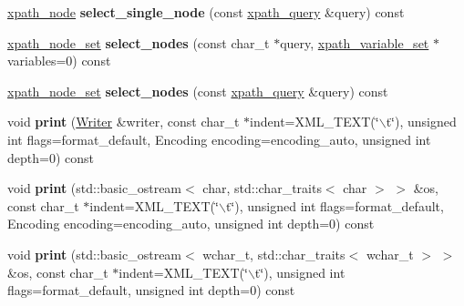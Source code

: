 \begin{DoxyCompactItemize}
\item 
\hypertarget{classphys_1_1xml_1_1Node_a6e63ac46658ba2484bf58d47f4fb4044}{
\hyperlink{classphys_1_1xml_1_1xpath__node}{xpath\_\-node} {\bfseries select\_\-single\_\-node} (const \hyperlink{classphys_1_1xml_1_1xpath__query}{xpath\_\-query} \&query) const }
\label{d7/d0a/classphys_1_1xml_1_1Node_a6e63ac46658ba2484bf58d47f4fb4044}

\item 
\hypertarget{classphys_1_1xml_1_1Node_ad59ea495afeb7bdfba213d0d77699bdc}{
\hyperlink{classphys_1_1xml_1_1xpath__node__set}{xpath\_\-node\_\-set} {\bfseries select\_\-nodes} (const char\_\-t $\ast$query, \hyperlink{classphys_1_1xml_1_1xpath__variable__set}{xpath\_\-variable\_\-set} $\ast$variables=0) const }
\label{d7/d0a/classphys_1_1xml_1_1Node_ad59ea495afeb7bdfba213d0d77699bdc}

\item 
\hypertarget{classphys_1_1xml_1_1Node_a283417484d52b3e4646affac0f84b068}{
\hyperlink{classphys_1_1xml_1_1xpath__node__set}{xpath\_\-node\_\-set} {\bfseries select\_\-nodes} (const \hyperlink{classphys_1_1xml_1_1xpath__query}{xpath\_\-query} \&query) const }
\label{d7/d0a/classphys_1_1xml_1_1Node_a283417484d52b3e4646affac0f84b068}

\item 
\hypertarget{classphys_1_1xml_1_1Node_a0b6778b4a7602abd979157adfbbe4d98}{
void {\bfseries print} (\hyperlink{classphys_1_1xml_1_1Writer}{Writer} \&writer, const char\_\-t $\ast$indent=XML\_\-TEXT(\char`\"{}$\backslash$t\char`\"{}), unsigned int flags=format\_\-default, Encoding encoding=encoding\_\-auto, unsigned int depth=0) const }
\label{d7/d0a/classphys_1_1xml_1_1Node_a0b6778b4a7602abd979157adfbbe4d98}

\item 
\hypertarget{classphys_1_1xml_1_1Node_a43cd84b829b4dd2acf0702960d485a11}{
void {\bfseries print} (std::basic\_\-ostream$<$ char, std::char\_\-traits$<$ char $>$ $>$ \&os, const char\_\-t $\ast$indent=XML\_\-TEXT(\char`\"{}$\backslash$t\char`\"{}), unsigned int flags=format\_\-default, Encoding encoding=encoding\_\-auto, unsigned int depth=0) const }
\label{d7/d0a/classphys_1_1xml_1_1Node_a43cd84b829b4dd2acf0702960d485a11}

\item 
\hypertarget{classphys_1_1xml_1_1Node_af879d58cf08553c5f2dfa813e7a56ce6}{
void {\bfseries print} (std::basic\_\-ostream$<$ wchar\_\-t, std::char\_\-traits$<$ wchar\_\-t $>$ $>$ \&os, const char\_\-t $\ast$indent=XML\_\-TEXT(\char`\"{}$\backslash$t\char`\"{}), unsigned int flags=format\_\-default, unsigned int depth=0) const }
\label{d7/d0a/classphys_1_1xml_1_1Node_af879d58cf08553c5f2dfa813e7a56ce6}


\end{DoxyCompactItemize}
